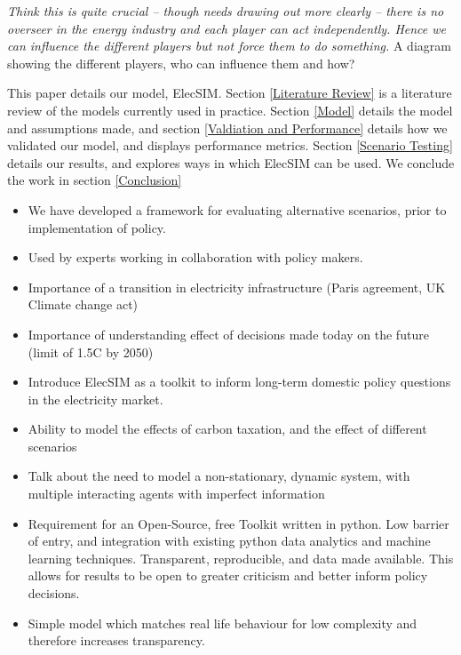  {\color{red} \textit{Think this is quite crucial -- though needs drawing out more clearly -- there is no overseer in the energy industry and each player can act independently. Hence we can influence the different players but not force them to do something.} A diagram showing the different players, who can influence them and how?}

This paper details our model, ElecSIM. Section \ref{Literature Review} is a literature review of the models currently used in practice. Section \ref{Model} details the model and assumptions made, and section \ref{Valdiation and Performance} details how we validated our model, and displays performance metrics. Section \ref{Scenario Testing} details our results, and explores ways in which ElecSIM can be used. We conclude the work in section \ref{Conclusion}
 

\begin{itemize}
	\item We have developed a framework for evaluating alternative scenarios, prior to implementation of policy.
	\item Used by experts working in collaboration with policy makers.
	\item Importance of a transition in electricity infrastructure (Paris agreement, UK Climate change act)
	\item Importance of understanding effect of decisions made today on the future (limit of 1.5C by 2050)
	\item Introduce ElecSIM as a toolkit to inform long-term domestic policy questions in the electricity market. 
	\item Ability to model the effects of carbon taxation, and the effect of different scenarios 
	\item Talk about the need to model a non-stationary, dynamic system, with multiple interacting agents with imperfect information
	\item Requirement for an Open-Source, free Toolkit written in python. Low barrier of entry, and integration with existing python data analytics and machine learning techniques. Transparent, reproducible, and data made available. This allows for results to be open to greater criticism and better inform policy decisions.
	\item Simple model which matches real life behaviour for low complexity and therefore increases transparency.
\end{itemize}

